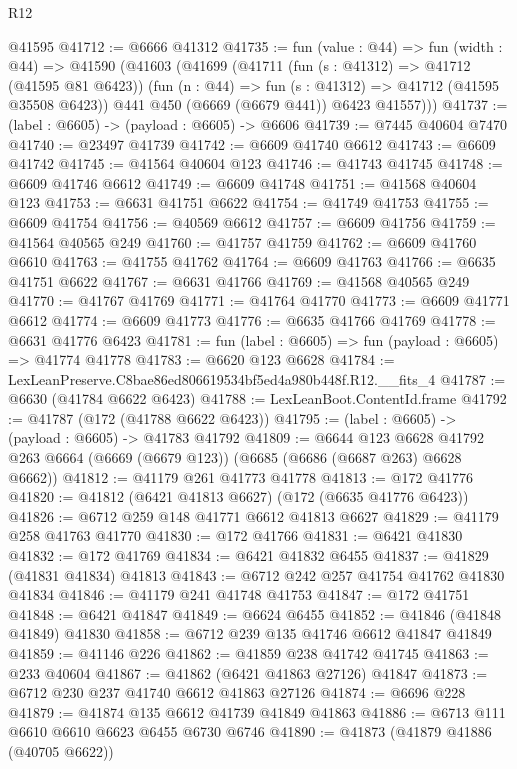 \begin{lexlean}{R12}
\begin{coremodule}
    @41595
@41712 := @6666 @41312
@41735 := fun (value : @44) =>
  fun (width : @44) =>
  @41590
    (@41603
      (@41699
        (@41711
          (fun (s : @41312) => @41712 (@41595 @81 @6423))
          (fun (n : @44) => fun (s : @41312) => @41712 (@41595 @35508 @6423))
          @441
          @450
          (@6669 (@6679 @441))
          @6423
          @41557)))
@41737 := (label : @6605) -> (payload : @6605) -> @6606
@41739 := @7445 @40604 @7470
@41740 := @23497 @41739
@41742 := @6609 @41740 @6612
@41743 := @6609 @41742
@41745 := @41564 @40604 @123
@41746 := @41743 @41745
@41748 := @6609 @41746 @6612
@41749 := @6609 @41748
@41751 := @41568 @40604 @123
@41753 := @6631 @41751 @6622
@41754 := @41749 @41753
@41755 := @6609 @41754
@41756 := @40569 @6612
@41757 := @6609 @41756
@41759 := @41564 @40565 @249
@41760 := @41757 @41759
@41762 := @6609 @41760 @6610
@41763 := @41755 @41762
@41764 := @6609 @41763
@41766 := @6635 @41751 @6622
@41767 := @6631 @41766
@41769 := @41568 @40565 @249
@41770 := @41767 @41769
@41771 := @41764 @41770
@41773 := @6609 @41771 @6612
@41774 := @6609 @41773
@41776 := @6635 @41766 @41769
@41778 := @6631 @41776 @6423
@41781 := fun (label : @6605) => fun (payload : @6605) => @41774 @41778
@41783 := @6620 @123 @6628
@41784 := LexLeanPreserve.C8bae86ed806619534bf5ed4a980b448f.R12.__fits_4
@41787 := @6630 (@41784 @6622 @6423)
@41788 := LexLeanBoot.ContentId.frame
@41792 := @41787 (@172 (@41788 @6622 @6423))
@41795 := (label : @6605) -> (payload : @6605) -> @41783 @41792
@41809 := @6644
    @123
    @6628
    @41792
    @263
    @6664
    (@6669 (@6679 @123))
    (@6685 (@6686 (@6687 @263) @6628 @6662))
@41812 := @41179 @261 @41773 @41778
@41813 := @172 @41776
@41820 := @41812 (@6421 @41813 @6627) (@172 (@6635 @41776 @6423))
@41826 := @6712 @259 @148 @41771 @6612 @41813 @6627
@41829 := @41179 @258 @41763 @41770
@41830 := @172 @41766
@41831 := @6421 @41830
@41832 := @172 @41769
@41834 := @6421 @41832 @6455
@41837 := @41829 (@41831 @41834) @41813
@41843 := @6712 @242 @257 @41754 @41762 @41830 @41834
@41846 := @41179 @241 @41748 @41753
@41847 := @172 @41751
@41848 := @6421 @41847
@41849 := @6624 @6455
@41852 := @41846 (@41848 @41849) @41830
@41858 := @6712 @239 @135 @41746 @6612 @41847 @41849
@41859 := @41146 @226
@41862 := @41859 @238 @41742 @41745
@41863 := @233 @40604
@41867 := @41862 (@6421 @41863 @27126) @41847
@41873 := @6712 @230 @237 @41740 @6612 @41863 @27126
@41874 := @6696 @228
@41879 := @41874 @135 @6612 @41739 @41849 @41863
@41886 := @6713 @111 @6610 @6610 @6623 @6455 @6730 @6746
@41890 := @41873 (@41879 @41886 (@40705 @6622))

\end{coremodule}
\end{lexlean}
